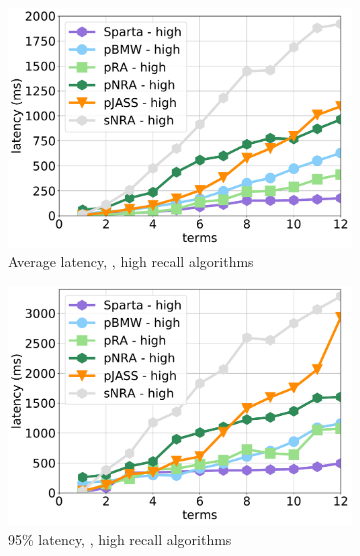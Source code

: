 {{\begin{figure}[tbh]
      \begin{subfigure}{0.32\textwidth}
         \includegraphics[width=\textwidth]{figures/latency_12threads_clueweb.pdf}
        \caption{Average latency, \cw, high recall algorithms}
        \label{fig:terms-scaling-high-avg}
      \end{subfigure}
     \hfill    
	\begin{subfigure}{0.32\textwidth}
    	\includegraphics[width=\textwidth]{figures/latency_95th_percentile_clueweb.pdf}
	\caption{95\% latency, \cw, high recall algorithms}
	\label{fig:terms-scaling-high-95}
    \end{subfigure} 
 \hfill
     \begin{subfigure}{0.32\textwidth}

\end{subfigure}
\end{figure}}}
